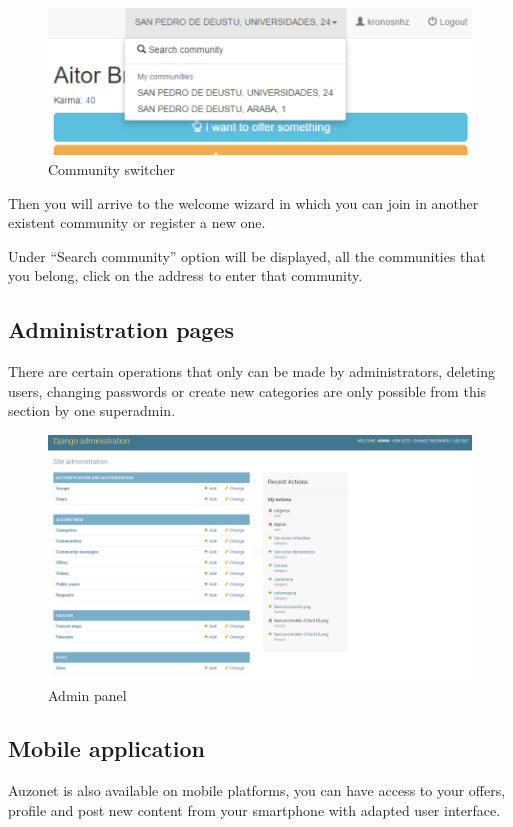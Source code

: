 \documentclass{DeustoFDP}
\begin{document}
\begin{figure}[h!]
\centering
\includegraphics[width=0.9\linewidth]{fig/Manual/multiaccount}
\caption[Community switcher]{Community switcher}
\label{fig:multiaccount}
\end{figure}


Then you will arrive to the welcome wizard in which you can join in another existent community or register a new one.

Under “Search community” option will be displayed, all the communities that you belong, click on the address to enter that community.
\newpage
\subsection{Administration pages}
There are certain operations that only can be made by administrators, deleting users, changing passwords or create new categories are only possible from this section by one superadmin.

\begin{figure}[h!]
\centering
\includegraphics[width=1\linewidth]{fig/Manual/adminpanel}
\caption[Admin panel]{Admin panel}
\label{fig:adminpanel}
\end{figure}
\newpage
\subsection{Mobile application}
Auzonet is also available on mobile platforms, you can have access to your offers, profile and post new content from your smartphone with adapted user interface.
\end{document}
